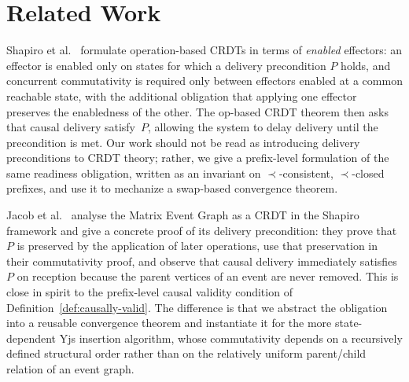 \documentclass[sigplan,screen]{acmart}
\newcommand{\hb}{\mathrel{\prec}}
\begin{document}
\section{Related Work}
\label{sec:related}

Shapiro et al.~\cite{Shapiro2011} formulate operation-based CRDTs in terms
of \emph{enabled} effectors: an effector is enabled only on states for
which a delivery precondition $P$ holds, and concurrent commutativity is
required only between effectors enabled at a common reachable state, with
the additional obligation that applying one effector preserves the
enabledness of the other.  The op-based CRDT theorem then asks that causal
delivery satisfy~$P$, allowing the system to delay delivery until the
precondition is met.  Our work should not be read as introducing
delivery preconditions to CRDT theory; rather, we give a prefix-level
formulation of the same readiness obligation, written as an invariant on
$\hb$-consistent, $\hb$-closed prefixes, and use it to mechanize a
swap-based convergence theorem.

Jacob et al.~\cite{MatrixEventGraph2022} analyse the Matrix Event Graph as
a CRDT in the Shapiro framework and give a concrete proof of its delivery
precondition: they prove that $P$ is preserved by the application of
later operations, use that preservation in their commutativity proof,
and observe that causal delivery immediately satisfies $P$ on reception
because the parent vertices of an event are never removed.  This is close
in spirit to the prefix-level causal validity condition of
Definition~\ref{def:causally-valid}.  The difference is that we abstract
the obligation into a reusable convergence theorem and instantiate it for
the more state-dependent Yjs insertion algorithm, whose commutativity
depends on a recursively defined structural order rather than on the
relatively uniform parent/child relation of an event graph.
\end{document}
